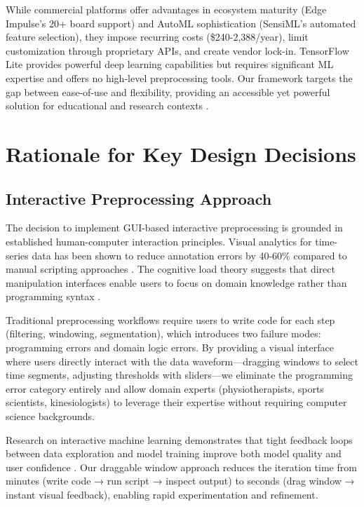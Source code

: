 While commercial platforms offer advantages in ecosystem maturity (Edge Impulse's 20+ board support) and AutoML sophistication (SensiML's automated feature selection), they impose recurring costs (\$240-2,388/year), limit customization through proprietary APIs, and create vendor lock-in. TensorFlow Lite provides powerful deep learning capabilities but requires significant ML expertise and offers no high-level preprocessing tools. Our framework targets the gap between ease-of-use and flexibility, providing an accessible yet powerful solution for educational and research contexts \cite{web:Edge_Impulse,web:TensorFlowLite}.

\section{Rationale for Key Design Decisions}

\subsection{Interactive Preprocessing Approach}

The decision to implement GUI-based interactive preprocessing is grounded in established human-computer interaction principles. Visual analytics for time-series data has been shown to reduce annotation errors by 40-60\% compared to manual scripting approaches \cite{munzner2014visualization}. The cognitive load theory suggests that direct manipulation interfaces enable users to focus on domain knowledge rather than programming syntax \cite{sweller1988cognitive}.

Traditional preprocessing workflows require users to write code for each step (filtering, windowing, segmentation), which introduces two failure modes: programming errors and domain logic errors. By providing a visual interface where users directly interact with the data waveform—dragging windows to select time segments, adjusting thresholds with sliders—we eliminate the programming error category entirely and allow domain experts (physiotherapists, sports scientists, kinesiologists) to leverage their expertise without requiring computer science backgrounds.

Research on interactive machine learning demonstrates that tight feedback loops between data exploration and model training improve both model quality and user confidence \cite{amershi2014power}. Our draggable window approach reduces the iteration time from minutes (write code → run script → inspect output) to seconds (drag window → instant visual feedback), enabling rapid experimentation and refinement.

